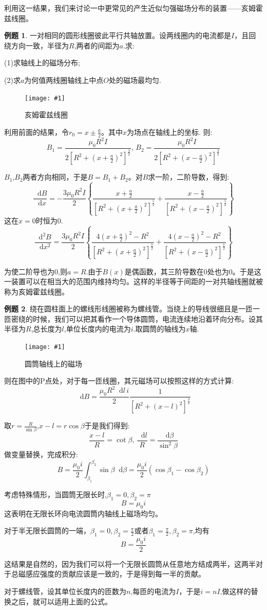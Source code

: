 \documentclass[12pt,a4paper,oneside]{report}
\theoremstyle{definition}
\newtheorem{example}{例题}[chapter]
\theoremstyle{remark}
\newcommand{\insertfig}[3]{
    \begin{figure}[ht]
        \centering
        \texttt{[image: \#1]}
        \caption{#2}
        \label{fig:#1}
    \end{figure}
}
\renewcommand{\d}{\mathop{}\!\mathrm{d}}
\begin{document}
利用这一结果，我们来讨论一中更常见的产生近似匀强磁场分布的装置——亥姆霍兹线圈。

\begin{example}
一对相同的圆形线圈彼此平行共轴放置。设两线圈内的电流都是$I$，且回绕方向一致，半径为$R$,两者的间距为$a$.求:

(1)求轴线上的磁场分布;

(2)求$a$为何值两线圈轴线上中点$O$处的磁场最均匀.
\insertfig{2-4.png}{亥姆霍兹线圈}{0.25}

利用前面的结果，令$r_0=x\pm\frac{a}{2}$。其中$x$为场点在轴线上的坐标.
则:
\[
B_1=\frac{\mu_0R^2I}{2[R^2+(x+\frac{a}{2})^2]^{\frac{3}{2}}}, \, B_2=\frac{\mu_0R^2I}{2[R^2+(x-\frac{a}{2})^2]^{\frac{3}{2}}}
\]

$B_1$,$B_2$两者方向相同，于是$B=B_1+B_2$。对$B$求一阶，二阶导数，得到:
\[
\frac{\d B}{\d x}=-\frac{3\mu_0R^2I}{2}\left\{ \frac{x+\frac{a}{2}}{[R^2+(x+\frac{a}{2})^2]^{\frac{5}{2}}}+\frac{x-\frac{a}{2}}{[R^2+(x-\frac{a}{2})^2]^{\frac{5}{2}}}\right\}
\]
这在$x=0$时恒为$0$.
\[
\frac{\d^2 B}{\d x^2} = \frac{3\mu_0R^2I}{2}\left\{ \frac{4(x+\frac{a}{2})^2-R^2}{[R^2+(x+\frac{a}{2})^2]^{\frac{7}{2}}}+\frac{4(x-\frac{a}{2})^2-R^2}{[R^2+(x-\frac{a}{2})^2]^{\frac{7}{2}}}\right\}
\]

为使二阶导也为$0$,则$a=R$.由于$B(x)$是偶函数，其三阶导数在$0$处也为$0$。于是这一装置可以在相当大的范围内维持均匀。这样的半径等于间距的一对共轴线圈就被称为亥姆霍兹线圈。
\end{example}

\begin{example}
  绕在圆柱面上的螺线形线圈被称为螺线管。当绕上的导线很细且是一匝一匝密绕的时候，我们可以把其看作一个导体圆筒，电流连续地沿着环向分布。设其半径为$R$,总长度为$l$,单位长度内的电流为$i$.取圆筒的轴线为$x$轴.

  \insertfig{2-5.png}{圆筒轴线上的磁场}{0.3}

  则在图中的P点处，对于每一匝线圈，其元磁场可以按照这样的方式计算:
  \[
  \d B = \frac{\mu_0R^2\d l\, i}{2}\frac{1}{[R^2+(x-l)^2]^\frac{3}{2}}
  \]

  取$r=\frac{R}{\sin\beta}$,$x-l=r\cos\beta$于是我们得到:
  \[
  \frac{x-l}{R}=\cot\beta, \,\frac{\d l}{R}=\frac{\d \beta}{\sin^2\beta}
  \]
  做变量替换，完成积分:
  \[
  B=\frac{\mu_0 i}{2}\int_{\beta_1}^{\beta_2}\sin\beta\d\beta=\frac{\mu_0i}{2}(\cos\beta_1-\cos\beta_2)
  \]

  考虑特殊情形，当圆筒无限长时,$\beta_1=0,\beta_2=\pi$
  \[
  B=\mu_0 i
  \]
  这表明在无限长环向电流圆筒内轴线上磁场均匀。
  
  对于半无限长圆筒的一端，$\beta_1=0,\beta_2=\frac{\pi}{2}$或者$\beta_1=\frac{\pi}{2},\beta_2=\pi$,均有
  \[
  B = \frac{\mu_0i}{2}
  \]

  这结果是自然的，因为我们可以将一个无限长圆筒从任意地方结成两半，这两半对于总磁感应强度的贡献应该是一致的，于是得到每一半的贡献。

  对于螺线管，设其单位长度内的匝数为$n$,每匝的电流为$I$，于是$i=nI$,做这样的替换之后，就可以适用上面的公式。
\end{example}
\end{document}
